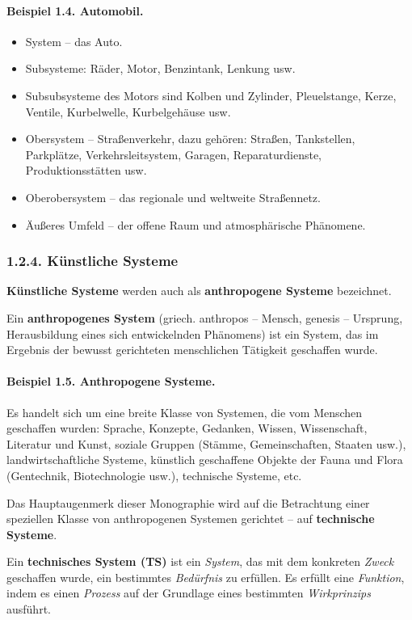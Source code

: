 \documentclass[11pt,a4paper]{article}
\begin{document}
\paragraph{Beispiel 1.4. Automobil.}
\begin{itemize}[noitemsep]
\item System -- das Auto.
\item Subsysteme: Räder, Motor, Benzintank, Lenkung usw.
\item Subsubsysteme des Motors sind Kolben und Zylinder, Pleuelstange, Kerze,
  Ventile, Kurbelwelle, Kurbelgehäuse usw.
\item Obersystem -- Straßenverkehr, dazu gehören: Straßen, Tankstellen,
  Parkplätze, Verkehrsleitsystem, Garagen, Reparaturdienste,
  Produktionsstätten usw.
\item Oberobersystem -- das regionale und weltweite Straßennetz.
\item Äußeres Umfeld -- der offene Raum und atmosphärische Phänomene.
\end{itemize}

\subsubsection*{1.2.4. Künstliche Systeme}

\textbf{Künstliche Systeme} werden auch als \textbf{anthropogene Systeme}
bezeichnet.

Ein \textbf{anthropogenes System} (griech. anthropos -- Mensch, genesis --
Ursprung, Herausbildung eines sich entwickelnden Phänomens) ist ein System,
das im Ergebnis der bewusst gerichteten menschlichen Tätigkeit geschaffen
wurde.

\paragraph{Beispiel 1.5. Anthropogene Systeme.}
Es handelt sich um eine breite Klasse von Systemen, die vom Menschen
geschaffen wurden: Sprache, Konzepte, Gedanken, Wissen, Wissenschaft,
Literatur und Kunst, soziale Gruppen (Stämme, Gemeinschaften, Staaten usw.),
landwirtschaftliche Systeme, künstlich geschaffene Objekte der Fauna und Flora
(Gentechnik, Biotechnologie usw.), technische Systeme, etc.

Das Hauptaugenmerk dieser Monographie wird auf die Betrachtung einer
speziellen Klasse von anthropogenen Systemen gerichtet -- auf
\textbf{technische Systeme}.

Ein \textbf{technisches System (TS)} ist ein \emph{System}, das mit dem
konkreten \emph{Zweck} geschaffen wurde, ein bestimmtes \emph{Bedürfnis} zu
erfüllen. Es erfüllt eine \emph{Funktion}, indem es einen \emph{Prozess} auf
der Grundlage eines bestimmten \emph{Wirkprinzips} ausführt.
\end{document}
